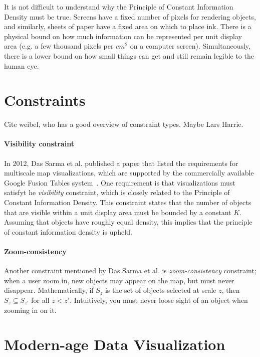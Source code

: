 \documentclass[11pt, oneside]{report}   	%
\begin{document}
It is not difficult to understand why the Principle of Constant Information Density must be true. Screens have a fixed number of pixels for rendering objects, and similarly, sheets of paper have a fixed area on which to place ink. There is a physical bound on how much information can be represented per unit display area (e.g. a few thousand pixels per $cm^2$ on a computer screen). Simultaneously, there is a lower bound on how small things can get and still remain legible to the human eye.

\section{Constraints}

Cite weibel, who has a good overview of constraint types. Maybe Lars Harrie.

\paragraph{Visibility constraint}
In 2012, Das Sarma et al. published a paper that listed the requirements for multiscale map visualizations, which are supported by the commercially available Google Fusion Tables system~\cite{sarma2012fusiontables}. One requirement is that visualizations must satisfyt he \emph{visibility} constraint, which is closely related to the Principle of Constant Information Density. This constraint states that the number of objects that are visible within a unit display area must be bounded by a constant $K$. Assuming that objects have roughly equal density, this implies that the principle of constant information density is upheld.


\paragraph{Zoom-consistency}
Another constraint mentioned by Das Sarma et al. is  \emph{zoom-consistency} constraint; when a user zoom in, new objects may appear on the map, but must never disappear. Mathematically, if $S_z$ is the set of objects selected at scale $z$, then $S_z \subseteq S_{z'}$ for all $z < z'$. Intuitively, you must never loose sight of an object when zooming in on it.



\section{Modern-age Data Visualization}
\end{document}

